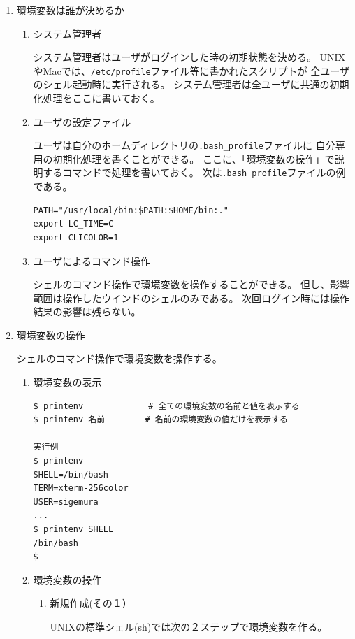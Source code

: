 \documentclass[a4j,dvipdfmx]{jarticle}
\begin{document}
\begin{enumerate}
\item 環境変数は誰が決めるか

\begin{enumerate}
\item システム管理者

システム管理者はユーザがログインした時の初期状態を決める。
UNIXやMacでは、\verb;/etc/profile;ファイル等に書かれたスクリプトが
全ユーザのシェル起動時に実行される。
システム管理者は全ユーザに共通の初期化処理をここに書いておく。

\item ユーザの設定ファイル

ユーザは自分のホームディレクトリの\verb;.bash_profile;ファイルに
自分専用の初期化処理を書くことができる。
ここに、「環境変数の操作」で説明するコマンドで処理を書いておく。
次は\verb;.bash_profile;ファイルの例である。

\begin{lstlisting}[numbers=none]
PATH="/usr/local/bin:$PATH:$HOME/bin:."
export LC_TIME=C
export CLICOLOR=1
\end{lstlisting}

\item ユーザによるコマンド操作

シェルのコマンド操作で環境変数を操作することができる。
但し、影響範囲は操作したウインドのシェルのみである。
次回ログイン時には操作結果の影響は残らない。

\end{enumerate}

\item 環境変数の操作

シェルのコマンド操作で環境変数を操作する。
\begin{enumerate}
\item 環境変数の表示

\begin{lstlisting}[numbers=none]
$ printenv             # 全ての環境変数の名前と値を表示する
$ printenv 名前        # 名前の環境変数の値だけを表示する

実行例
$ printenv
SHELL=/bin/bash
TERM=xterm-256color
USER=sigemura
...
$ printenv SHELL
/bin/bash
$
\end{lstlisting}

\item 環境変数の操作

\begin{enumerate}
\item 新規作成(その１）

UNIXの標準シェル(sh)では次の２ステップで環境変数を作る。


\end{enumerate}
\end{enumerate}
\end{enumerate}
\end{document}
